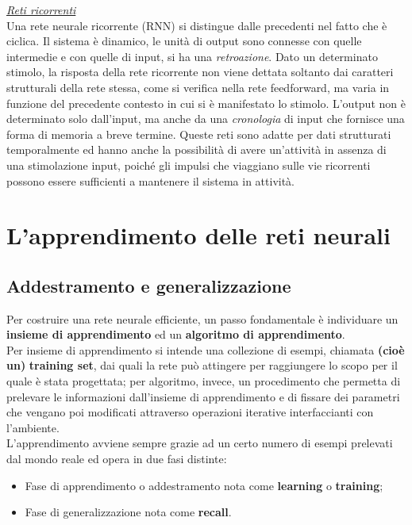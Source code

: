 \documentclass[12pt,a4paper,oneside]{book}
\begin{document}
		\underline{\emph{Reti ricorrenti}}\\
		Una rete neurale ricorrente (RNN) si distingue dalle precedenti nel fatto che è ciclica. Il sistema è dinamico, le unità di output sono connesse con quelle intermedie e con quelle di input, si ha una \emph{retroazione}. Dato un determinato stimolo, la risposta della rete ricorrente non viene dettata soltanto dai caratteri strutturali della rete stessa, come si verifica nella rete feedforward, ma varia in funzione del precedente contesto in cui si è manifestato lo stimolo. L'output non è determinato solo dall'input, ma anche da una \emph{cronologia} di input che fornisce una forma di memoria a breve termine. Queste reti sono adatte per dati strutturati temporalmente ed hanno anche la possibilità di avere un’attività in assenza di una stimolazione input, poiché gli impulsi che viaggiano sulle vie ricorrenti possono essere sufficienti a mantenere il sistema in attività.
	
	
	\chapter{L'apprendimento delle reti neurali}
	
	
	
	\section{Addestramento e generalizzazione}
		
		Per costruire una rete neurale efficiente, un passo fondamentale è individuare un \textbf{insieme di apprendimento} ed un \textbf{algoritmo di apprendimento}.\\
		Per insieme di apprendimento si intende una collezione di esempi, chiamata \textbf{(cioè un)} \textbf{training set}, dai quali la rete può attingere per raggiungere lo scopo per il quale è stata progettata; per algoritmo, invece, un procedimento che permetta di prelevare le informazioni dall'insieme di apprendimento e di fissare dei parametri che vengano poi modificati attraverso operazioni iterative interfaccianti con l'ambiente.\\
		L’apprendimento avviene sempre grazie ad un certo numero di esempi prelevati dal mondo reale ed opera in due fasi distinte: 
		
		\begin{itemize}
			\item Fase di apprendimento o addestramento nota come \textbf{learning} o \textbf{training};\\
			\item Fase di generalizzazione nota come \textbf{recall}.
		\end{itemize} 
		
\end{document}
